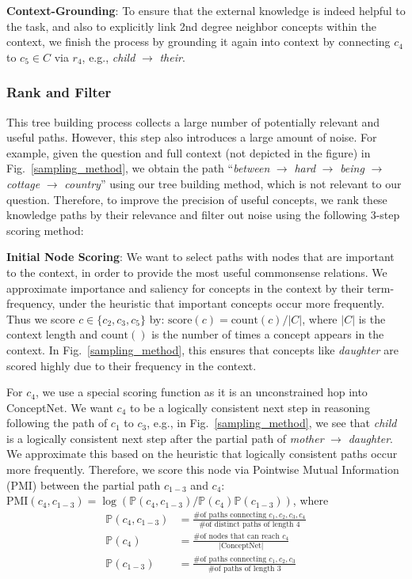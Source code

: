 \documentclass[11pt,a4paper]{article}
\def\figref#1{Fig.~\ref{#1}}
\newcommand{\prob}{\mathbb{P}}
\begin{document}
\noindent\textbf{Context-Grounding}:
To ensure that the external knowledge is indeed helpful to the task, and also to explicitly link 2nd degree neighbor concepts within the context, we finish the process by grounding it again into context by connecting $c_4$ to $c_5 \in C$ via $r_4$, e.g., {\it child} $\rightarrow$ {\it their}.

\subsubsection{Rank and Filter}
This tree building process collects a large number of potentially relevant and useful paths. However, this step also introduces a large amount of noise. For example, given the question and full context (not depicted in the figure) in \figref{sampling_method}, we obtain the path ``{\it between} $\rightarrow$  {\it hard} $\rightarrow$  {\it being} $\rightarrow$  {\it cottage} $\rightarrow$  {\it country}''  using our tree building method, which is not relevant to our question.
Therefore, to improve the precision of useful concepts, we rank these knowledge paths by their relevance and filter out noise using the following 3-step scoring method:


\noindent\textbf{Initial Node Scoring}:
We want to select paths with nodes that are important to the context, in order to provide the most useful commonsense relations.
We approximate importance and saliency for concepts in the context by their term-frequency, under the heuristic that important concepts occur more frequently. Thus we score $c \in \{c_2, c_3, c_5\}$ by:
$\text{score}(c) = \text{count}(c) / |C|$,
where $|C|$ is the context length and $\text{count}()$ is the number of times a concept appears in the context. In \figref{sampling_method}, this ensures that concepts like {\it daughter} are scored highly due to their frequency in the context.


For $c_4$, we use a special scoring function as it is an unconstrained hop into ConceptNet.
We want $c_4$ to be a logically consistent next step in reasoning following the path of $c_1$ to $c_3$, e.g., in \figref{sampling_method}, we see that {\it child} is a logically consistent next step after the partial path of {\it mother} $\rightarrow$ {\it daughter}. We approximate this based on the heuristic that logically consistent paths occur more frequently.
Therefore, we score this node via Pointwise Mutual Information (PMI) between the partial path $c_{1-3}$ and $c_4$: $\text{PMI}(c_4, c_{1-3}) = \log(\prob(c_4, c_{1-3})/\prob(c_4) \prob(c_{1-3}))$, where
\vspace{-2pt}
\begin{align*}
\prob(c_4, c_{1-3}) &= \frac{\text{\# of paths connecting } c_1, c_2, c_3, c_4}{\text{\# of distinct paths of length 4}}\\
\prob(c_4) &= \frac{\text{\# of nodes that can reach } c_4}{|\text{ConceptNet}|} \\
\prob(c_{1-3}) &= \frac{\text{\# of paths connecting } c_1, c_2, c_3}{\text{\# of paths of length 3}}
\end{align*}
\end{document}
